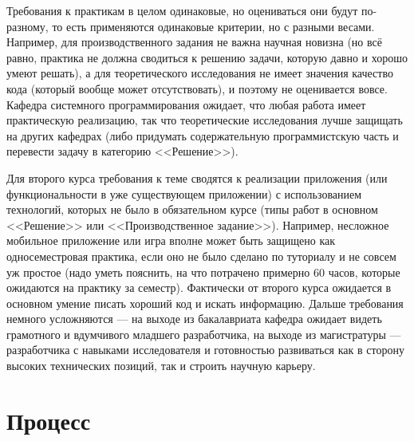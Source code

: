 \documentclass{article}
\begin{document}
Требования к практикам в целом одинаковые, но оцениваться они будут по-разному, то есть применяются одинаковые критерии, но с разными весами. Например, для производственного задания не важна научная новизна (но всё равно, практика не должна сводиться к решению задачи, которую давно и хорошо умеют решать), а для теоретического исследования не имеет значения качество кода (который вообще может отсутствовать), и поэтому не оценивается вовсе. Кафедра системного программирования ожидает, что любая работа имеет практическую реализацию, так что теоретические исследования лучше защищать на других кафедрах (либо придумать содержательную программистскую часть и перевести задачу в категорию <<Решение>>).

Для второго курса требования к теме сводятся к реализации приложения (или функциональности в уже существующем приложении) с использованием технологий, которых не было в обязательном курсе (типы работ в основном <<Решение>> или <<Производственное задание>>). Например, несложное мобильное приложение или игра вполне может быть защищено как односеместровая практика, если оно не было сделано по туториалу и не совсем уж простое (надо уметь пояснить, на что потрачено примерно 60 часов, которые ожидаются на практику за семестр). Фактически от второго курса ожидается в основном умение писать хороший код и искать информацию. Дальше требования немного усложняются --- на выходе из бакалавриата кафедра ожидает видеть грамотного и вдумчивого младшего разработчика, на выходе из магистратуры --- разработчика с навыками исследователя и готовностью развиваться как в сторону высоких технических позиций, так и строить научную карьеру.

\section{Процесс}
\label{section:process}
\end{document}

